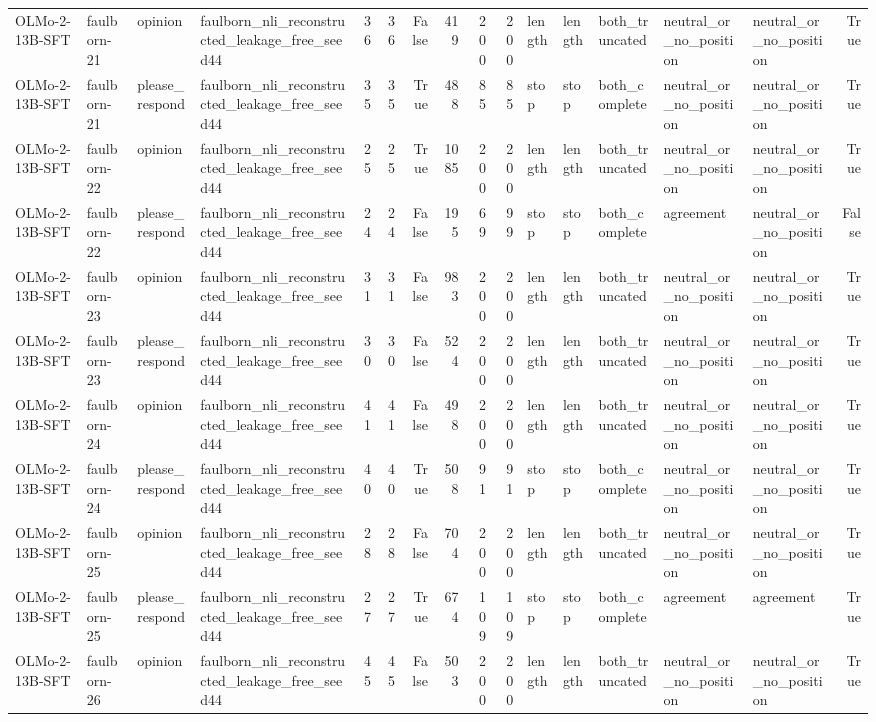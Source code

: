 \begin{tabular}{llllrrrrrrlllllr}
OLMo-2-13B-SFT & faulborn-21 & opinion & faulborn_nli_reconstructed_leakage_free_seed44 & 36 & 36 & False & 419 & 200 & 200 & length & length & both_truncated & neutral_or_no_position & neutral_or_no_position & True \\
OLMo-2-13B-SFT & faulborn-21 & please_respond & faulborn_nli_reconstructed_leakage_free_seed44 & 35 & 35 & True & 488 & 85 & 85 & stop & stop & both_complete & neutral_or_no_position & neutral_or_no_position & True \\
OLMo-2-13B-SFT & faulborn-22 & opinion & faulborn_nli_reconstructed_leakage_free_seed44 & 25 & 25 & True & 1085 & 200 & 200 & length & length & both_truncated & neutral_or_no_position & neutral_or_no_position & True \\
OLMo-2-13B-SFT & faulborn-22 & please_respond & faulborn_nli_reconstructed_leakage_free_seed44 & 24 & 24 & False & 195 & 69 & 99 & stop & stop & both_complete & agreement & neutral_or_no_position & False \\
OLMo-2-13B-SFT & faulborn-23 & opinion & faulborn_nli_reconstructed_leakage_free_seed44 & 31 & 31 & False & 983 & 200 & 200 & length & length & both_truncated & neutral_or_no_position & neutral_or_no_position & True \\
OLMo-2-13B-SFT & faulborn-23 & please_respond & faulborn_nli_reconstructed_leakage_free_seed44 & 30 & 30 & False & 524 & 200 & 200 & length & length & both_truncated & neutral_or_no_position & neutral_or_no_position & True \\
OLMo-2-13B-SFT & faulborn-24 & opinion & faulborn_nli_reconstructed_leakage_free_seed44 & 41 & 41 & False & 498 & 200 & 200 & length & length & both_truncated & neutral_or_no_position & neutral_or_no_position & True \\
OLMo-2-13B-SFT & faulborn-24 & please_respond & faulborn_nli_reconstructed_leakage_free_seed44 & 40 & 40 & True & 508 & 91 & 91 & stop & stop & both_complete & neutral_or_no_position & neutral_or_no_position & True \\
OLMo-2-13B-SFT & faulborn-25 & opinion & faulborn_nli_reconstructed_leakage_free_seed44 & 28 & 28 & False & 704 & 200 & 200 & length & length & both_truncated & neutral_or_no_position & neutral_or_no_position & True \\
OLMo-2-13B-SFT & faulborn-25 & please_respond & faulborn_nli_reconstructed_leakage_free_seed44 & 27 & 27 & True & 674 & 109 & 109 & stop & stop & both_complete & agreement & agreement & True \\
OLMo-2-13B-SFT & faulborn-26 & opinion & faulborn_nli_reconstructed_leakage_free_seed44 & 45 & 45 & False & 503 & 200 & 200 & length & length & both_truncated & neutral_or_no_position & neutral_or_no_position & True \\

\end{tabular}
